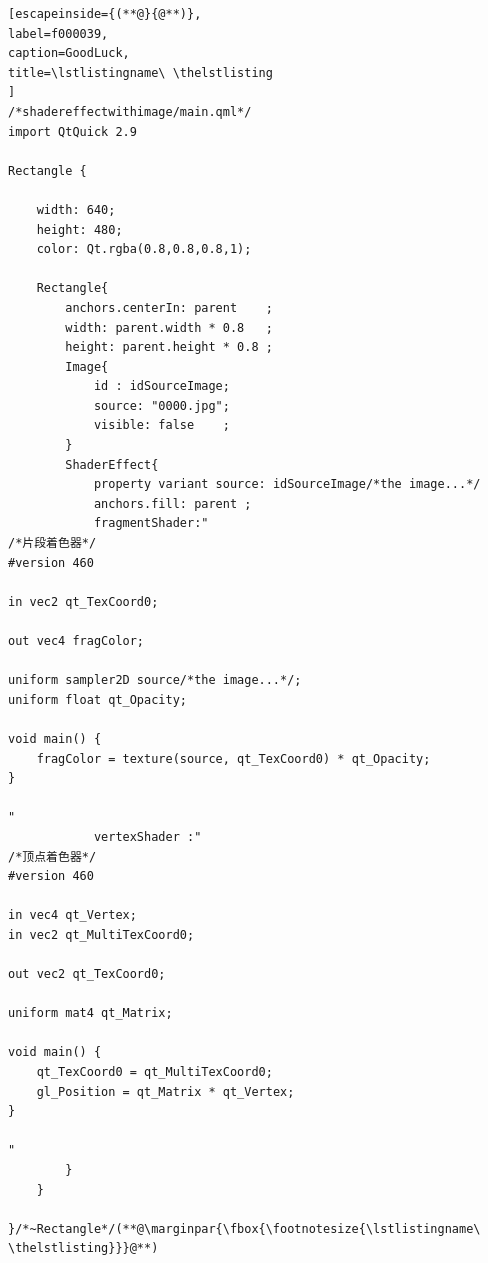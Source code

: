 \FloatBarrier
\begin{lstlisting}[escapeinside={(**@}{@**)},
label=f000039,
caption=GoodLuck,
title=\lstlistingname\ \thelstlisting
]
/*shadereffectwithimage/main.qml*/
import QtQuick 2.9

Rectangle {

    width: 640;
    height: 480;
    color: Qt.rgba(0.8,0.8,0.8,1);

    Rectangle{
        anchors.centerIn: parent    ;
        width: parent.width * 0.8   ;
        height: parent.height * 0.8 ;
        Image{
            id : idSourceImage;
            source: "0000.jpg";
            visible: false    ;
        }
        ShaderEffect{
            property variant source: idSourceImage/*the image...*/
            anchors.fill: parent ;
            fragmentShader:"
/*片段着色器*/
#version 460

in vec2 qt_TexCoord0;

out vec4 fragColor;

uniform sampler2D source/*the image...*/;
uniform float qt_Opacity;

void main() {
    fragColor = texture(source, qt_TexCoord0) * qt_Opacity;
}

"
            vertexShader :"
/*顶点着色器*/
#version 460

in vec4 qt_Vertex;
in vec2 qt_MultiTexCoord0;

out vec2 qt_TexCoord0;

uniform mat4 qt_Matrix;

void main() {
    qt_TexCoord0 = qt_MultiTexCoord0;
    gl_Position = qt_Matrix * qt_Vertex;
}

"
        }
    }

}/*~Rectangle*/(**@\marginpar{\fbox{\footnotesize{\lstlistingname\ \thelstlisting}}}@**)\end{lstlisting}          %





























